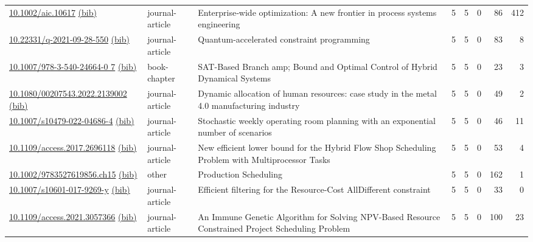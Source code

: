 {\begin{longtable}{p{5cm}lp{11cm}rrrrr}
\href{http://dx.doi.org/10.1002/aic.10617}{10.1002/aic.10617} \href{https://www.doi2bib.org/bib/10.1002/aic.10617}{(bib)} & journal-article & Enterprise‐wide optimization: A new frontier in process systems engineering & 5 & 5 & 0 & 86 & 412 \\
\href{http://dx.doi.org/10.22331/q-2021-09-28-550}{10.22331/q-2021-09-28-550} \href{https://www.doi2bib.org/bib/10.22331/q-2021-09-28-550}{(bib)} & journal-article & Quantum-accelerated constraint programming & 5 & 5 & 0 & 83 & 8 \\
\href{http://dx.doi.org/10.1007/978-3-540-24664-0_7}{10.1007/978-3-540-24664-0 7} \href{https://www.doi2bib.org/bib/10.1007/978-3-540-24664-0_7}{(bib)} & book-chapter & SAT-Based Branch  amp; Bound and Optimal Control of Hybrid Dynamical Systems & 5 & 5 & 0 & 23 & 3 \\
\href{http://dx.doi.org/10.1080/00207543.2022.2139002}{10.1080/00207543.2022.2139002} \href{https://www.doi2bib.org/bib/10.1080/00207543.2022.2139002}{(bib)} & journal-article & Dynamic allocation of human resources: case study in the metal 4.0 manufacturing industry & 5 & 5 & 0 & 49 & 2 \\
\href{http://dx.doi.org/10.1007/s10479-022-04686-4}{10.1007/s10479-022-04686-4} \href{https://www.doi2bib.org/bib/10.1007/s10479-022-04686-4}{(bib)} & journal-article & Stochastic weekly operating room planning with an exponential number of scenarios & 5 & 5 & 0 & 46 & 11 \\
\href{http://dx.doi.org/10.1109/access.2017.2696118}{10.1109/access.2017.2696118} \href{https://www.doi2bib.org/bib/10.1109/access.2017.2696118}{(bib)} & journal-article & New efficient lower bound for the Hybrid Flow Shop Scheduling Problem with Multiprocessor Tasks & 5 & 5 & 0 & 53 & 4 \\
\href{http://dx.doi.org/10.1002/9783527619856.ch15}{10.1002/9783527619856.ch15} \href{https://www.doi2bib.org/bib/10.1002/9783527619856.ch15}{(bib)} & other & Production Scheduling & 5 & 5 & 0 & 162 & 1 \\
\href{http://dx.doi.org/10.1007/s10601-017-9269-y}{10.1007/s10601-017-9269-y} \href{https://www.doi2bib.org/bib/10.1007/s10601-017-9269-y}{(bib)} & journal-article & Efficient filtering for the Resource-Cost AllDifferent constraint & 5 & 5 & 0 & 33 & 0 \\
\href{http://dx.doi.org/10.1109/access.2021.3057366}{10.1109/access.2021.3057366} \href{https://www.doi2bib.org/bib/10.1109/access.2021.3057366}{(bib)} & journal-article & An Immune Genetic Algorithm for Solving NPV-Based Resource Constrained Project Scheduling Problem & 5 & 5 & 0 & 100 & 23 \\

\end{longtable}}
